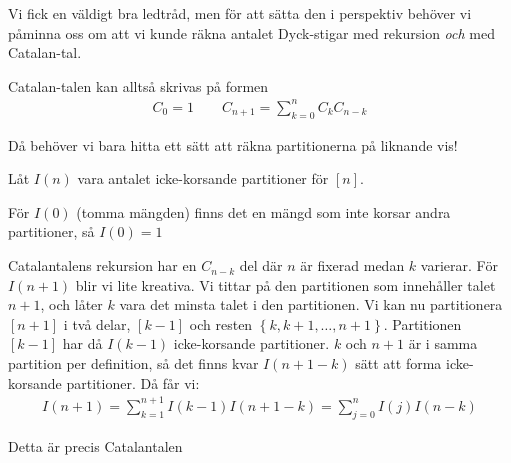 \documentclass{tufte-handout}
\begin{document}
\begin{ans}
  \noindent Vi fick en väldigt bra ledtråd, men för att sätta den i perspektiv behöver vi påminna oss om att vi kunde räkna antalet Dyck-stigar med rekursion \textit{och} med Catalan-tal.
  \par\bigskip
  \noindent Catalan-talen kan alltså skrivas på formen
  \begin{equation*}
    \begin{gathered}
      C_0 = 1\qquad C_{n+1} = \sum_{k=0}^{n}C_{k}C_{n-k}
    \end{gathered}
  \end{equation*}\par
  \noindent Då behöver vi bara hitta ett sätt att räkna partitionerna på liknande vis!
  \par\bigskip
  \noindent Låt $I(n)$ vara antalet icke-korsande partitioner för $[n]$.\par
  \noindent För $I(0)$ (tomma mängden) finns det en mängd som inte korsar andra partitioner, så $I(0) = 1$\par
  \noindent Catalantalens rekursion har en $C_{n-k}$ del där $n$ är fixerad medan $k$ varierar. För $I(n+1)$ blir vi lite kreativa. Vi tittar på den partitionen som innehåller talet $n+1$, och låter $k$ vara det minsta talet i den partitionen. Vi kan nu partitionera $[n+1]$ i två delar, $[k-1]$ och resten $\left\{k,k+1,\hdots,n+1\right\}$. Partitionen $[k-1]$ har då $I(k-1)$ icke-korsande partitioner. $k$ och $n+1$ är i samma partition per definition, så det finns kvar $I(n+1-k)$ sätt att forma icke-korsande partitioner. Då får vi:
  \begin{equation*}
    \begin{gathered}
      I(n+1) = \sum_{k=1}^{n+1}I(k-1)I(n+1-k) = \sum_{j=0}^{n}I(j)I(n-k)
    \end{gathered}
  \end{equation*}\par
  \noindent Detta är precis Catalantalen
\end{ans}



\end{document}
